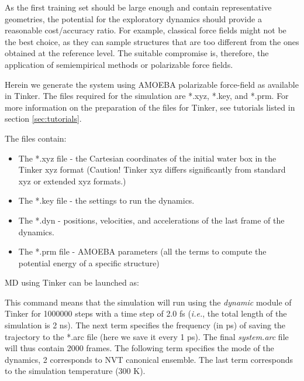 \documentclass[12pt]{article}
\begin{document}
As the first training set should be large enough and contain representative geometries, the potential for the exploratory dynamics should provide a reasonable cost/accuracy ratio. For example, classical force fields might not be the best choice, as they can sample structures that are too different from the ones obtained at the reference level. The suitable compromise is, therefore, the application of semiempirical methods or polarizable force fields.

Herein we generate the system using AMOEBA polarizable force-field as available in Tinker. The files required for the simulation are *.xyz,  *.key, and *.prm. For more information on the preparation of the files for Tinker, see tutorials listed in section \ref{sec:tutorials}.

The files contain:

\begin{itemize}
    \item The *.xyz file - the Cartesian coordinates of the initial water box in the Tinker xyz format (Caution! Tinker xyz differs significantly from standard xyz or extended xyz formats.)  
    \item The *.key file - the settings to run the dynamics.
    \item The *.dyn - positions, velocities, and accelerations of the last frame of the dynamics.
    \item The *.prm file - AMOEBA parameters (all the terms to compute the potential energy of a specific structure)
\end{itemize}

MD using Tinker can be launched as:
\begin{center}
\end{center}

This command means that the simulation will run using the \textit{dynamic} module of Tinker for 1000000 steps with a time step of 2.0 fs (\textit{i.e.}, the total length of the simulation is 2 ns). The next term specifies the frequency (in ps) of saving the trajectory to the *.arc file (here we save it every 1 ps). The final \textit{system.arc} file will thus contain 2000 frames. The following term specifies the mode of the dynamics, 2 corresponds to NVT canonical ensemble. The last term corresponds to the simulation temperature (300 K). 
\end{document}
